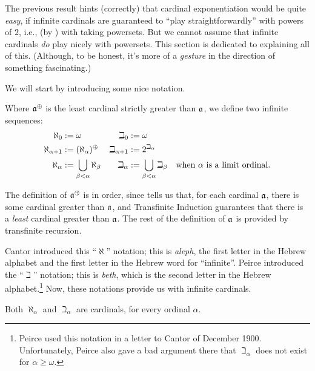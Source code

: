\documentclass[../../../include/open-logic-section]{subfiles}
\begin{document}


The previous result hints (correctly) that cardinal exponentiation
would be quite \emph{easy}, if infinite cardinals are guaranteed to
``play straightforwardly'' with powers of $2$, i.e., (by
) with taking powersets. But we
cannot assume that infinite cardinals \emph{do} play nicely with
powersets. This section is dedicated to explaining all of this.
(Although, to be honest, it's more of a \emph{gesture} in the
direction of something fascinating.)

We will start by introducing some nice notation.

\begin{defn}
Where $\mathfrak{a}^{\oplus}$ is the least cardinal strictly greater
than $\mathfrak{a}$, we define two infinite sequences:
\begin{align*}
	\aleph_{0} &:= \omega & 		
	\beth_{0} &:= \omega\\
	\aleph_{\alpha \ordplus 1} &:= \cardsucc{(\aleph_{\alpha})} &
	\beth_{\alpha+1} &:= \cardexpo{2}{\beth_{\alpha}}\\
	\aleph_{\alpha} &:= \bigcup_{\beta< \alpha} \aleph_{\beta} &
	\beth_{\alpha} &:= \bigcup_{\beta < \alpha}\beth_{\beta} & \text{when $\alpha$ is a limit ordinal}.
	\end{align*}
\end{defn}

The definition of $\mathfrak{a}^{\oplus}$ is in order, since
 tells us that, for each
cardinal $\mathfrak{a}$, there is some cardinal greater than
$\mathfrak{a}$, and Transfinite Induction guarantees that there is a
\emph{least} cardinal greater than $\mathfrak{a}$. The rest of the
definition of $\mathfrak{a}$ is provided by transfinite recursion. 

Cantor introduced this ``$\aleph$'' notation; this is \emph{aleph},
the first letter in the Hebrew alphabet and the first letter in the
Hebrew word for ``infinite''. Peirce introduced the ``$\beth$''
notation; this is \emph{beth}, which is the second letter in the
Hebrew alphabet.\footnote{Peirce used this notation in a letter to
Cantor of December 1900. Unfortunately, Peirce also gave a bad
argument there that $\beth_\alpha$ does not exist for $\alpha \geq
\omega$.} Now, these notations provide us with infinite cardinals.

\begin{prop}
Both $\aleph_\alpha$ and $\beth_\alpha$ are cardinals, for every
ordinal $\alpha$. 
\end{prop}
\end{document}
